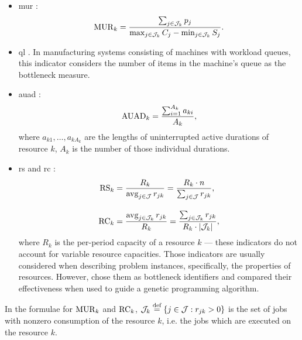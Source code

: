 \begin{itemize}
    \item \acf{mur} \citep{Lawrence1994}:
    $$
    \indMUR{k} = \frac{\sum_{j \in \JobsOnResource{k}} \duration{j}}%
                      {\max_{j \in \JobsOnResource{k}} \jobend{j}
                       - \min_{j \in \JobsOnResource{k}} \jobstart{j}}.
    $$

    \item \acf{ql} \citep{Lawrence1994}.
    In manufacturing systems consisting of machines with workload queues,
    this indicator considers the number of items in the machine's queue as the bottleneck measure.
    
    \item \acf{auad} \citep{Roser2001}:
    $$
    \operatorname{AUAD}_{k} = \frac{\sum_{i=1}^{A_k} a_{ki}}{A_k},
    $$
    where $a_{k1}, \dots, a_{kA_k}$ are the lengths of uninterrupted active durations of resource $k$,
    $A_k$ is the number of those individual durations.

    \item \acf{rs} \citep{Cooper1976}
        and \acf{rc} \citep{Patterson1976}:
        \begin{align*}
        \indRS{k} &= \frac{R_{k}}%
                          {\avg_{j \in \Jobs} \consumption{j}{k}}
                  = \frac{R_{k} \cdot n}%
                         {\sum_{j \in \Jobs} \consumption{j}{k}},
        \\[1em]
        \indRC{k} &= \frac{\avg_{j \in \JobsOnResource{k}} \consumption{j}{k}}%
                          {R_{k}}
                   = \frac{\sum_{j \in \JobsOnResource{k}} \consumption{j}{k}}%
                          {R_{k} \cdot |\JobsOnResource{k}|},
        \end{align*}
        where $R_{k}$ is the per-period capacity of a resource $k$ ---
        these indicators do not account for variable resource capacities.
        Those indicators are usually considered when describing problem instances,
        specifically, the properties of resources.
        However, \citet{Luo2023} chose them as bottleneck identifiers
        and compared their effectiveness when used to guide a genetic programming algorithm.
\end{itemize}

In the formulae for $\operatorname{MUR}_{k}$ and $\operatorname{RC}_{k}$,
$\mathcal{J}_{k} \overset{\text{def}}{=} \{j \in \mathcal{J} : r_{j k} > 0\}$
is the set of jobs with nonzero consumption of the resource $k$,
i.e. the jobs which are executed on the resource $k$.

